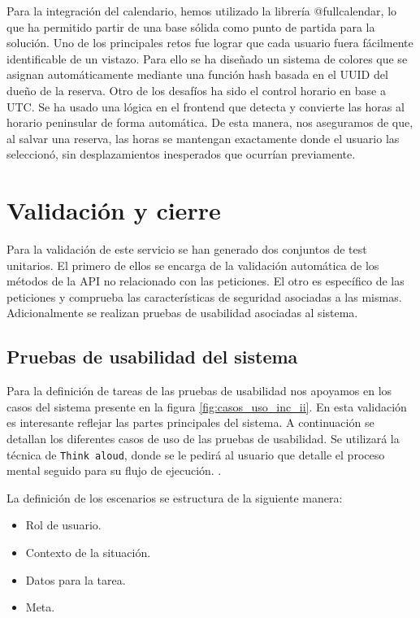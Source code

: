 Para la integración del calendario, hemos utilizado la librería @fullcalendar, lo que ha permitido partir de una base sólida como punto de partida para la solución. Uno de los principales retos fue lograr que cada usuario fuera fácilmente identificable de un vistazo. Para ello se ha diseñado un sistema de colores que se asignan automáticamente mediante una función hash basada en el UUID del dueño de la reserva. Otro de los desafíos ha sido el control horario en base a UTC. Se ha usado una lógica en el frontend que detecta y convierte las horas al horario peninsular de forma automática. De esta manera, nos aseguramos de que, al salvar una reserva, las horas se mantengan exactamente donde el usuario las seleccionó, sin desplazamientos inesperados que ocurrían previamente.

\section{Validación y cierre}

Para la validación de este servicio se han generado dos conjuntos de test unitarios. El primero de ellos se encarga de la validación automática de los métodos de la API no relacionado con las peticiones. El otro es específico de las peticiones y comprueba las características de seguridad asociadas a las mismas. Adicionalmente se realizan pruebas de usabilidad asociadas al sistema.

\subsection{Pruebas de usabilidad del sistema}

Para la definición de tareas de las pruebas de usabilidad nos apoyamos en los casos del sistema presente en la figura \ref{fig:casos_uso_inc_ii}. En esta validación es interesante reflejar las partes principales del sistema. A continuación se detallan los diferentes casos de uso de las pruebas de usabilidad. Se utilizará la técnica de \texttt{Think aloud}, donde se le pedirá al usuario que detalle el proceso mental seguido para su flujo de ejecución. \cite{linkedin2026usability}.

La definición de los escenarios se estructura de la siguiente manera: 
\begin{itemize}
  \item Rol de usuario. 
  \item Contexto de la situación.
  \item Datos para la tarea.
  \item Meta.
\end{itemize}
\clearpage

